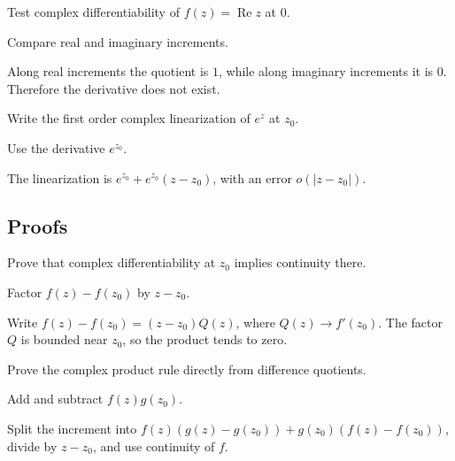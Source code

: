 \begin{exercise}\label{exr:iv01-expand-04}
Test complex differentiability of \(f(z)=\operatorname{Re}z\) at \(0\).
\end{exercise}
\begin{hint}
Compare real and imaginary increments.
\end{hint}
\begin{solution}
Along real increments the quotient is \(1\), while along imaginary increments it is \(0\). Therefore the derivative does not exist.
\end{solution}

\begin{exercise}[Linearization]\label{exr:iv01-expand-05}
Write the first order complex linearization of \(e^z\) at \(z_0\).
\end{exercise}
\begin{hint}
Use the derivative \(e^{z_0}\).
\end{hint}
\begin{solution}
The linearization is \(e^{z_0}+e^{z_0}(z-z_0)\), with an error \(o(|z-z_0|)\).
\end{solution}

\subsection*{Proofs}

\begin{exercise}\label{exr:iv01-expand-06}
Prove that complex differentiability at \(z_0\) implies continuity there.
\end{exercise}
\begin{hint}
Factor \(f(z)-f(z_0)\) by \(z-z_0\).
\end{hint}
\begin{solution}
Write \(f(z)-f(z_0)=(z-z_0)Q(z)\), where \(Q(z)\to f'(z_0)\). The factor \(Q\) is bounded near \(z_0\), so the product tends to zero.
\end{solution}

\begin{exercise}\label{exr:iv01-expand-07}
Prove the complex product rule directly from difference quotients.
\end{exercise}
\begin{hint}
Add and subtract \(f(z)g(z_0)\).
\end{hint}
\begin{solution}
Split the increment into \(f(z)(g(z)-g(z_0))+g(z_0)(f(z)-f(z_0))\), divide by \(z-z_0\), and use continuity of \(f\).
\end{solution}

